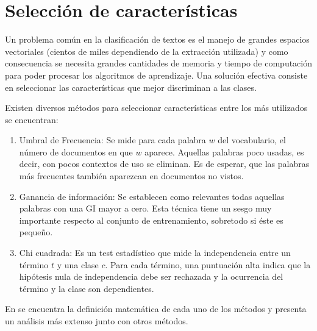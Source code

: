 \section{Selección de características}

Un problema común en la clasificación de textos es el manejo de grandes espacios vectoriales (cientos de miles dependiendo de la extracción utilizada) y como consecuencia se necesita grandes cantidades de memoria y tiempo de computación para poder procesar los algoritmos de aprendizaje. Una solución efectiva consiste en seleccionar las características que mejor discriminan a las clases.

Existen diversos métodos para seleccionar características entre los más utilizados se encuentran:

\begin{enumerate}
    \item Umbral de Frecuencia: Se mide para cada palabra $w$ del vocabulario, el número de documentos en que $w$ aparece. Aquellas palabras poco usadas, es decir, con pocos contextos de uso se eliminan. Es de esperar, que las palabras más frecuentes también aparezcan en documentos no vistos.
    
    \item Ganancia de información: Se establecen como relevantes todas aquellas palabras con una GI mayor a cero. Esta técnica tiene un sesgo muy importante respecto al conjunto de entrenamiento, sobretodo si éste es pequeño.  
    \item Chi cuadrada: Es un test estadístico que mide la independencia entre un término $t$ y una clase $c$. Para cada término, una puntuación alta indica que la hipótesis nula de independencia debe ser rechazada y la ocurrencia del término y la clase son dependientes.
\end{enumerate}

En \citep{yang1997comparative} se encuentra la definición matemática de cada uno de los métodos y \citep{forman2003extensive} presenta un análisis más extenso junto con otros métodos. 
